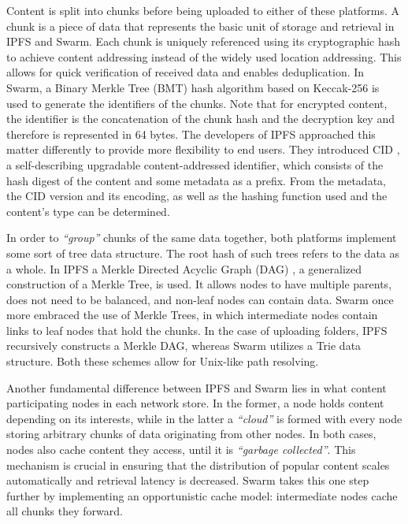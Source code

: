 Content is split into chunks before being uploaded to either of these platforms. A chunk is a piece of data that represents the basic unit of storage and retrieval in IPFS and Swarm. Each chunk is uniquely referenced using its cryptographic hash to achieve content addressing instead of the widely used location addressing. This allows for quick verification of received data and enables deduplication. In Swarm, a Binary Merkle Tree (BMT)  \citep{tron_2020} hash algorithm based on Keccak-256 is used to generate the identifiers of the chunks. Note that for encrypted content, the identifier is the concatenation of the chunk hash and the decryption key and therefore is represented in 64 bytes. The developers of IPFS approached this matter differently to provide more flexibility to end users. They introduced CID  \citep{multiformat}, a self-describing upgradable content-addressed identifier, which consists of the hash digest of the content and some metadata as a prefix. From the metadata, the CID version and its encoding, as well as the hashing function used and the content’s type can be determined.

In order to \emph{``group''} chunks of the same data together, both platforms implement some sort of tree data structure. The root hash of such trees refers to the data as a whole. In IPFS a Merkle Directed Acyclic Graph (DAG)  \citep{benet_2014}, a generalized construction of a Merkle Tree, is used. It allows nodes to have multiple parents, does not need to be balanced, and non-leaf nodes can contain data. Swarm once more embraced the use of Merkle Trees, in which intermediate nodes contain links to leaf nodes that hold the chunks. In the case of uploading folders, IPFS recursively constructs a Merkle DAG, whereas Swarm utilizes a Trie  \citep{tron_2020} data structure. Both these schemes allow for Unix-like path resolving.

Another fundamental difference between IPFS and Swarm lies in what content participating nodes in each network store. In the former, a node holds content depending on its interests, while in the latter a \emph{``cloud''} is formed with every node storing arbitrary chunks of data originating from other nodes. In both cases, nodes also cache content they access, until it is \emph{``garbage collected''}. This mechanism is crucial in ensuring that the distribution of popular content scales automatically and retrieval latency is decreased. Swarm takes this one step further by implementing an opportunistic cache model: intermediate nodes cache all chunks they forward.

